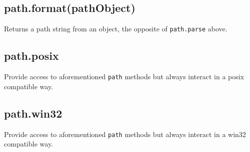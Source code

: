 \begin{Shaded}
\begin{Highlighting}[]
\NormalTok{(}\CharTok{\textbackslash{}\textbackslash{}}\CharTok{\textbackslash{}\textbackslash{}}\CharTok{\textbackslash{}\textbackslash{}}\NormalTok{)}
\NormalTok{\{}
    \NormalTok{: }\StringTok{,}
    \NormalTok{: }\NormalTok{,}
    \NormalTok{: }\NormalTok{,}
    \NormalTok{: }\NormalTok{,}
    \NormalTok{: }
\NormalTok{\}}
\end{Highlighting}
\end{Shaded}

\subsection{path.format(pathObject)}\label{path.formatpathobject}

Returns a path string from an object, the opposite of
\texttt{path.parse} above.

\begin{Shaded}
\begin{Highlighting}[]
\NormalTok{(\{}
    \NormalTok{: }\NormalTok{,}
    \NormalTok{: }\NormalTok{,}
    \NormalTok{: }\NormalTok{,}
    \NormalTok{: }\NormalTok{,}
    \NormalTok{: }
\NormalTok{\})}
\end{Highlighting}
\end{Shaded}

\subsection{path.posix}\label{path.posix}

Provide access to aforementioned \texttt{path} methods but always
interact in a posix compatible way.

\subsection{path.win32}\label{path.win32}

Provide access to aforementioned \texttt{path} methods but always
interact in a win32 compatible way.
